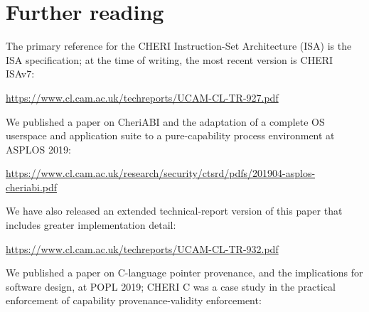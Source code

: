 \documentclass[11pt]{article}
\begin{document}
%
%

\section{Further reading}
\label{sec:further_reading}

The primary reference for the CHERI Instruction-Set Architecture (ISA) is the
ISA specification; at the time of writing, the most recent version is CHERI
ISAv7:

\smallskip
\noindent
\url{https://www.cl.cam.ac.uk/techreports/UCAM-CL-TR-927.pdf}
\smallskip

\noindent
We published a paper on CheriABI and the adaptation of a complete OS userspace
and application suite to a pure-capability process environment at ASPLOS 2019:

\smallskip
\noindent
\url{https://www.cl.cam.ac.uk/research/security/ctsrd/pdfs/201904-asplos-cheriabi.pdf}
\smallskip

\noindent
We have also released an extended technical-report version of this paper that
includes greater implementation detail:

\smallskip
\noindent
\url{https://www.cl.cam.ac.uk/techreports/UCAM-CL-TR-932.pdf}
\smallskip

\noindent
We published a paper on C-language pointer provenance, and the implications
for software design, at POPL 2019; CHERI C was a case study in the practical
enforcement of capability provenance-validity enforcement:
\end{document}
